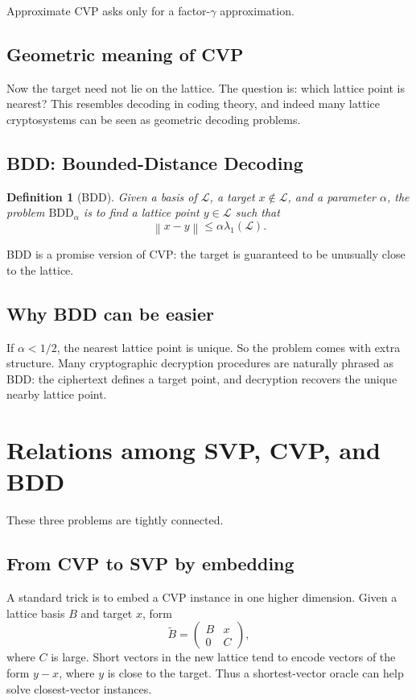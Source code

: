 \documentclass[11pt]{article}
\newtheorem{definition}[theorem]{Definition}
\newcommand{\norm}[1]{\left\lVert #1 \right\rVert}
\newcommand{\calL}{\mathcal{L}}
\begin{document}
Approximate CVP asks only for a factor-$\gamma$ approximation.

\subsection{Geometric meaning of CVP}
Now the target need not lie on the lattice. The question is: which lattice point is nearest? This resembles decoding in coding theory, and indeed many lattice cryptosystems can be seen as geometric decoding problems.

\subsection{BDD: Bounded-Distance Decoding}

\begin{definition}[BDD]
Given a basis of $\calL$, a target $x\notin \calL$, and a parameter $\alpha$, the problem $\mathrm{BDD}_\alpha$ is to find a lattice point $y\in \calL$ such that
\[
\norm{x-y}\le \alpha\lambda_1(\calL).
\]
\end{definition}

BDD is a promise version of CVP: the target is guaranteed to be unusually close to the lattice.

\subsection{Why BDD can be easier}
If $\alpha<1/2$, the nearest lattice point is unique. So the problem comes with extra structure. Many cryptographic decryption procedures are naturally phrased as BDD: the ciphertext defines a target point, and decryption recovers the unique nearby lattice point.

\section{Relations among SVP, CVP, and BDD}

These three problems are tightly connected.

\subsection{From CVP to SVP by embedding}
A standard trick is to embed a CVP instance in one higher dimension. Given a lattice basis $B$ and target $x$, form
\[
\widetilde B =
\begin{pmatrix}
B & x \\
0 & C
\end{pmatrix},
\]
where $C$ is large. Short vectors in the new lattice tend to encode vectors of the form $y-x$, where $y$ is close to the target. Thus a shortest-vector oracle can help solve closest-vector instances.
\end{document}
